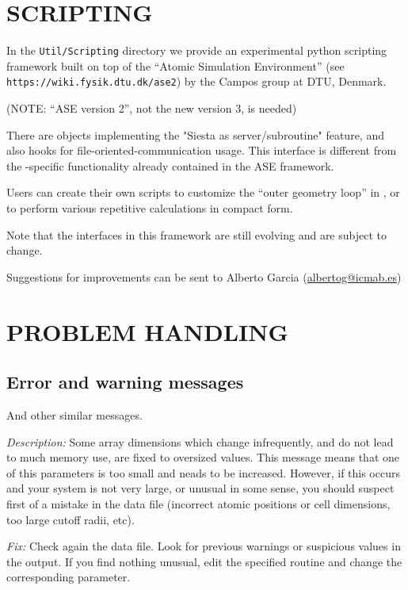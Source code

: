 \section{SCRIPTING}

In the \texttt{Util/Scripting} directory we provide an experimental
python scripting framework built on top of the ``Atomic Simulation
Environment'' (see \texttt{https://wiki.fysik.dtu.dk/ase2}) by the Campos
group at DTU, Denmark.

(NOTE: ``ASE version 2'', not the new version 3, is needed)

There are objects implementing the "Siesta as server/subroutine" feature, and
also hooks for file-oriented-communication usage. This interface is
different from the \siesta-specific functionality already
contained in the ASE framework.

Users can create their own scripts to customize the ``outer geometry loop''
in \siesta, or to perform various repetitive calculations in compact form.

Note that the interfaces in this framework are still evolving and are
subject to change.

Suggestions for improvements can be sent to Alberto Garcia
(\href{mailto:albertog@icmab.es}{albertog@icmab.es})

\section{PROBLEM HANDLING}

\subsection{Error and warning messages}

\begin{description}
\itemsep 10pt
\parsep 0pt

\item[\texttt{chkdim: ERROR: In \textit{routine} dimension \textit{parameter} =
\textit{value}. It must be  ...}]

And other similar messages.

\textit{Description:} Some array dimensions which change infrequently,
and do not lead to much memory use, are fixed to oversized
values. This message means that one of this parameters is too small
and neads to be increased.  However, if this occurs and your system is
not very large, or unusual in some sense, you should suspect first of
a mistake in the data file (incorrect atomic positions or cell
dimensions, too large cutoff radii, etc).

\textit{Fix:} Check again the data file.  Look for previous warnings or
suspicious values in the output.  If you find nothing unusual, edit
the specified routine and change the corresponding parameter.  

\end{description}




